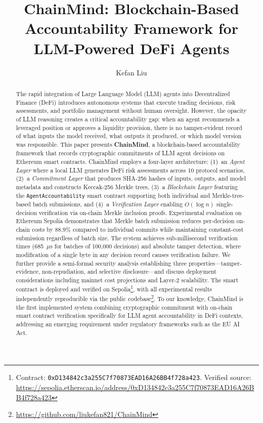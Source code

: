 \documentclass[manuscript,nonacm]{acmart}
\begin{document}
\title{ChainMind: Blockchain-Based Accountability Framework for LLM-Powered DeFi Agents}

\author{Kefan Liu}

\begin{abstract}
The rapid integration of Large Language Model (LLM) agents into Decentralized Finance (DeFi) introduces autonomous systems that execute trading decisions, risk assessments, and portfolio management without human oversight.
However, the opacity of LLM reasoning creates a critical accountability gap: when an agent recommends a leveraged position or approves a liquidity provision, there is no tamper-evident record of what inputs the model received, what outputs it produced, or which model version was responsible.
This paper presents \textbf{ChainMind}, a blockchain-based accountability framework that records cryptographic commitments of LLM agent decisions on Ethereum smart contracts.
ChainMind employs a four-layer architecture: (1)~an \emph{Agent Layer} where a local LLM generates DeFi risk assessments across 10 protocol scenarios, (2)~a \emph{Commitment Layer} that produces SHA-256 hashes of inputs, outputs, and model metadata and constructs Keccak-256 Merkle trees, (3)~a \emph{Blockchain Layer} featuring the \texttt{AgentAccountability} smart contract supporting both individual and Merkle-tree-based batch submissions, and (4)~a \emph{Verification Layer} enabling $O(\log n)$ single-decision verification via on-chain Merkle inclusion proofs.
Experimental evaluation on Ethereum Sepolia demonstrates that Merkle batch submission reduces per-decision on-chain costs by 88.9\% compared to individual commits while maintaining constant-cost submission regardless of batch size.
The system achieves sub-millisecond verification times (685~$\mu$s for batches of 100,000 decisions) and absolute tamper detection, where modification of a single byte in any decision record causes verification failure.
We further provide a semi-formal security analysis establishing three properties---tamper-evidence, non-repudiation, and selective disclosure---and discuss deployment considerations including mainnet cost projections and Layer-2 scalability.
The smart contract is deployed and verified on Sepolia\footnote{Contract: \texttt{0xD134842c3a255C7f70873EAD16A26BB4f728a423}. Verified source: \url{https://sepolia.etherscan.io/address/0xD134842c3a255C7f70873EAD16A26BB4f728a423}}, with all experimental results independently reproducible via the public codebase\footnote{\url{https://github.com/liukefan821/ChainMind}}.
To our knowledge, ChainMind is the first implemented system combining cryptographic commitment with on-chain smart contract verification specifically for LLM agent accountability in DeFi contexts, addressing an emerging requirement under regulatory frameworks such as the EU AI Act.
\end{abstract}
\end{document}

